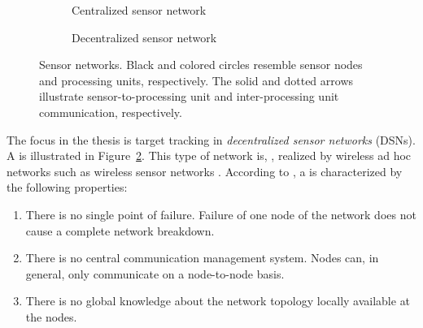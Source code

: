 \begin{figure}[tb]
	\centering
	\begin{subfigure}[b]{0.475\columnwidth}
		\centering
		\begin{tikzpicture}[scale=.1]
			
		\end{tikzpicture}
		\caption{Centralized sensor network}
		\label{fig:intro:centralized}
	\end{subfigure}
	\begin{subfigure}[b]{0.475\columnwidth}
		\centering
		\begin{tikzpicture}[scale=.1]
			
		\end{tikzpicture}
		\caption{Decentralized sensor network}
		\label{fig:intro:decentralized}
	\end{subfigure}
	\caption{Sensor networks. Black and colored circles resemble sensor nodes and processing units, respectively. The solid and dotted arrows illustrate sensor-to-processing unit and inter-processing unit communication, respectively.} 
	\label{fig:bkg:sn}
\end{figure}

The focus in the thesis is target tracking in \emph{decentralized sensor networks} (DSNs). A \abbrDSN is illustrated in Figure~\ref{fig:intro:decentralized}. This type of network is, \eg, realized by wireless ad hoc networks such as wireless sensor networks \cite{Toh1997WANET}. According to \cite{Grime1994CEP}, a \abbrDSN is characterized by the following properties:
\begin{enumerate}[label=C\arabic*]
	\item There is no single point of failure. Failure of one node of the network does not cause a complete network breakdown.
	\item There is no central communication management system. Nodes can, in general, only communicate on a node-to-node basis.
	\item There is no global knowledge about the network topology locally available at the nodes.
\end{enumerate}

